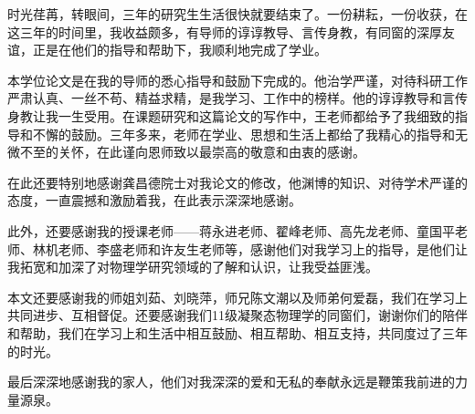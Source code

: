 \begin{thanks}

时光荏苒，转眼间，三年的研究生生活很快就要结束了。一份耕耘，一份收获，在这三年的时间里，我收益颇多，有导师的谆谆教导、言传身教，有同窗的深厚友谊，正是在他们的指导和帮助下，我顺利地完成了学业。

本学位论文是在我的导师的悉心指导和鼓励下完成的。他治学严谨，对待科研工作严肃认真、一丝不苟、精益求精，是我学习、工作中的榜样。他的谆谆教导和言传身教让我一生受用。在课题研究和这篇论文的写作中，王老师都给予了我细致的指导和不懈的鼓励。三年多来，老师在学业、思想和生活上都给了我精心的指导和无微不至的关怀，在此谨向恩师致以最崇高的敬意和由衷的感谢。

在此还要特别地感谢龚昌德院士对我论文的修改，他渊博的知识、对待学术严谨的态度，一直震撼和激励着我，在此表示深深地感谢。

此外，还要感谢我的授课老师——蒋永进老师、翟峰老师、高先龙老师、童国平老师、林机老师、李盛老师和许友生老师等，感谢他们对我学习上的指导，是他们让我拓宽和加深了对物理学研究领域的了解和认识，让我受益匪浅。

本文还要感谢我的师姐刘茹、刘晓萍，师兄陈文潮以及师弟何爱磊，我们在学习上共同进步、互相督促。还要感谢我们11级凝聚态物理学的同窗们，谢谢你们的陪伴和帮助，我们在学习上和生活中相互鼓励、相互帮助、相互支持，共同度过了三年的时光。

最后深深地感谢我的家人，他们对我深深的爱和无私的奉献永远是鞭策我前进的力量源泉。

\end{thanks}